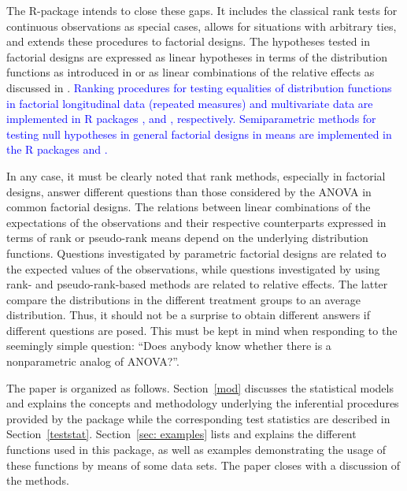 The R-package  intends to close these gaps. It includes 
the classical rank tests for continuous observations as special cases, 
allows for situations with arbitrary ties, and extends these procedures to 
factorial designs. The hypotheses tested in factorial designs are expressed as 
linear hypotheses in terms of the distribution functions as introduced in 
\cite{akritas1997nonparametric} or as linear combinations of the relative 
effects as discussed in \cite{brunner2017rank}. \textcolor{blue}{Ranking procedures 
for testing equalities of distribution functions in factorial longitudinal data (repeated measures) and multivariate data are implemented in R packages
 \citep{noguchi2012nparld},  and  \citep{burchett2017nonparametric,kiefel2022package}, respectively. Semiparametric methods for testing null hypotheses in general factorial designs in means are implemented in the R packages  \citep{friedrich2017gfd} and  \citep{friedrich2019resampling}.}


In any case, it must be clearly noted that rank methods, especially in 
factorial designs, answer different questions than those considered by the 
ANOVA in common factorial designs. The relations between linear combinations of 
the expectations of the observations and their respective counterparts 
expressed in terms of rank or pseudo-rank means depend on the underlying 
distribution functions. Questions investigated by parametric factorial designs 
are related to the expected values of the observations, while questions 
investigated by using rank- and pseudo-rank-based methods are related to 
relative effects. The latter compare the distributions in the different 
treatment groups to an average distribution. Thus, it should not be a surprise 
to obtain different answers if different questions are posed. This must be kept 
in mind when responding to the seemingly simple question: ``Does anybody know 
whether there is a nonparametric analog of ANOVA?''. 

The paper is organized as follows. Section~\ref{mod} discusses the statistical 
models and explains the concepts and methodology underlying the inferential procedures 
provided by the package  while the corresponding test statistics
are described in Section~\ref{teststat}. Section~\ref{sec: examples} lists and 
explains the different functions used in this package, as well as examples 
demonstrating the usage of these functions by means of some data sets. The 
paper closes with a discussion of the methods. 



